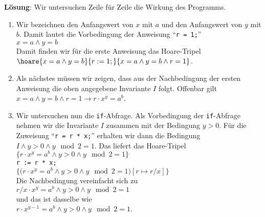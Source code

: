 \noindent
\textbf{L\"osung}:
Wir untersuchen Zeile f\"ur Zeile die Wirkung des Programms.
\begin{enumerate}
\item Wir bezeichnen den Anfangswert von $x$ mit $a$ und den Anfangswert von $y$ mit $b$. 
      Damit lautet die Vorbedingung der Anweisung ``\texttt{r = 1;}'' 
      \\[0.1cm]
      \hspace*{1.3cm}
      $x = a \wedge y = b$
      \\[0.1cm]
      Damit finden wir f\"ur die erste Anweisung das Hoare-Tripel
      \\[0.2cm]
      \hspace*{1.3cm}
      $\hoare{x = a \wedge y = b}{r := 1;}{x = a \wedge y = b \wedge r = 1}$. 
\item Als n\"achstes m\"ussen wir zeigen, dass aus der Nachbedingung der ersten Anweisung
      die oben angegebene Invariante $I$ folgt.  Offenbar gilt
      \\[0.2cm]
      \hspace*{1.3cm}
      $x = a \wedge y = b \wedge r = 1 \rightarrow r \cdot x^y = a^b$.
\item Wir untersuchen nun die \texttt{if}-Abfrage.  Als Vorbedingung der
      \texttt{if}-Abfrage nehmen wir die Invariante $I$ zusammen mit der Bedingung 
      $y > 0$.  F\"ur die Zuweisung ``\texttt{r = r * x;}'' erhalten wir dann die 
      Bedingung $I \wedge y > 0 \wedge y \mod 2 = 1$.  Das liefert das Hoare-Tripel
      \\[0.2cm]
      \hspace*{1.3cm}
      $\{r \cdot x^y = a^b \wedge y > 0 \wedge y \mod 2 = 1\}$
      \\[0.2cm]
      \hspace*{2.3cm} \texttt{r := r * x;}
      \\[0.2cm]
      \hspace*{1.3cm}
      $\{\bigl(r \cdot x^y = a^b \wedge y > 0 \wedge y \mod 2 = 1\bigr)[r \mapsto r/x]\}$
      \\[0.2cm]
      Die Nachbedingung vereinfacht sich zu 
      \\[0.2cm]
      \hspace*{1.3cm}
      $r/x \cdot x^y = a^b \wedge y > 0 \wedge y \mod 2 = 1$ 
      \\[0.2cm]
      und das ist dasselbe wie
      \\[0.2cm]
      \hspace*{1.3cm}
      $r \cdot x^{y-1} = a^b \wedge y > 0 \wedge y \mod 2 = 1$.

\end{enumerate}
